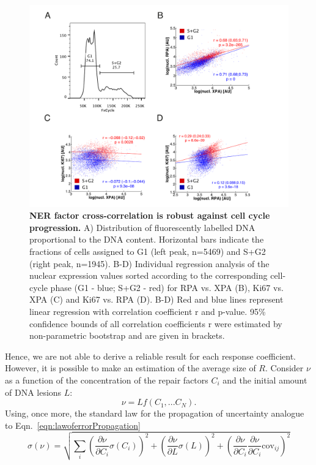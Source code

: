 \begin{figure}[htbp]
	\begin{center}
		\includegraphics[width=1\textwidth]{Abbildungen/figureTAC_4.pdf}
		\caption{\textbf{NER factor cross-correlation is robust against cell cycle progression.} A) Distribution of fluorescently labelled DNA proportional to the DNA content. Horizontal bars indicate the fractions of cells assigned to G1 (left peak, n=5469) and S+G2 (right peak, n=1945).  B-D) Individual regression analysis of the nuclear expression values sorted according to the corresponding cell-cycle phase (G1 - blue; S+G2 - red) for RPA vs. XPA (B), Ki67 vs. XPA (C) and Ki67 vs. RPA (D). B-D) Red and blue lines represent linear regression with correlation coefficient r and p-value. 95\% confidence bounds of all correlation coefficients r were estimated by non-parametric bootstrap and are given in brackets.}
		\label{fig:FC_cell_cycle}
	\end{center}
\end{figure}  
Hence, we are not able to derive a reliable result for each response coefficient. However, it is possible to make an estimation of the average size of $R$. Consider $\nu$ as a function of the concentration of the repair factors $C_i$ and the initial amount of DNA lesions $L$:
\begin{equation}
	\nu = Lf(C_1,...C_N).
\end{equation}
Using, once more, the standard law for the propagation of uncertainty analogue to Eqn.\ \ref{eqn:lawoferrorPropagation}
 \begin{equation}
 \sigma(\nu) = \sqrt{\sum_{i}\left(\frac{\partial \nu}{\partial C_i}\sigma(C_i) \right)^2 + \left(\frac{\partial \nu}{\partial L}\sigma(L)\right)^2 + \left(\frac{\partial \nu}{\partial C_i} \frac{\partial \nu}{\partial C_i}\textrm{cov}_{ij}\right)^2}
 \end{equation}  
 

